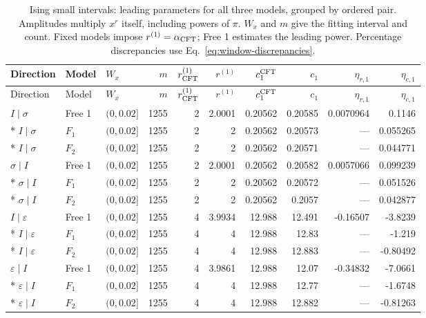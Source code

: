 \begingroup\setlength{\tabcolsep}{2pt}
\begin{longtable}{lllrrrrrrr}
\caption{Ising small intervals: leading parameters for all three models, grouped by ordered pair. Amplitudes multiply $x^r$ itself, including powers of $\pi$. $W_x$ and $m$ give the fitting interval and count. Fixed models impose $r^{(1)}=\alpha_{\rm CFT}$; Free 1 estimates the leading power. Percentage discrepancies use Eq.~\eqref{eq:window-discrepancies}.}
\label{tab:window-small_ising-leading}\\\toprule
Direction & Model & $W_x$ & $m$ & $r^{(1)}_{\rm CFT}$ & $r^{(1)}$ & $c_1^{\rm CFT}$ & $c_1$ & $\eta_{r,1}$ & $\eta_{c,1}$\\\midrule
\endfirsthead
\toprule
Direction & Model & $W_x$ & $m$ & $r^{(1)}_{\rm CFT}$ & $r^{(1)}$ & $c_1^{\rm CFT}$ & $c_1$ & $\eta_{r,1}$ & $\eta_{c,1}$\\\midrule
\endhead
\bottomrule\endfoot
$I\mid \sigma$ & Free 1 & $(0,0.02]$ & 1255 & 2 & 2.0001 & 0.20562 & 0.20585 & 0.0070964 & 0.1146\\*
$I\mid \sigma$ & $F_1$ & $(0,0.02]$ & 1255 & 2 & 2 & 0.20562 & 0.20573 & --- & 0.055265\\*
$I\mid \sigma$ & $F_2$ & $(0,0.02]$ & 1255 & 2 & 2 & 0.20562 & 0.20571 & --- & 0.044771\\
\midrule
$\sigma\mid I$ & Free 1 & $(0,0.02]$ & 1255 & 2 & 2.0001 & 0.20562 & 0.20582 & 0.0057066 & 0.099239\\*
$\sigma\mid I$ & $F_1$ & $(0,0.02]$ & 1255 & 2 & 2 & 0.20562 & 0.20572 & --- & 0.051526\\*
$\sigma\mid I$ & $F_2$ & $(0,0.02]$ & 1255 & 2 & 2 & 0.20562 & 0.2057 & --- & 0.042877\\
\midrule
$I\mid \varepsilon$ & Free 1 & $(0,0.02]$ & 1255 & 4 & 3.9934 & 12.988 & 12.491 & -0.16507 & -3.8239\\*
$I\mid \varepsilon$ & $F_1$ & $(0,0.02]$ & 1255 & 4 & 4 & 12.988 & 12.83 & --- & -1.219\\*
$I\mid \varepsilon$ & $F_2$ & $(0,0.02]$ & 1255 & 4 & 4 & 12.988 & 12.883 & --- & -0.80492\\
\midrule
$\varepsilon\mid I$ & Free 1 & $(0,0.02]$ & 1255 & 4 & 3.9861 & 12.988 & 12.07 & -0.34832 & -7.0661\\*
$\varepsilon\mid I$ & $F_1$ & $(0,0.02]$ & 1255 & 4 & 4 & 12.988 & 12.77 & --- & -1.6748\\*
$\varepsilon\mid I$ & $F_2$ & $(0,0.02]$ & 1255 & 4 & 4 & 12.988 & 12.882 & --- & -0.81263\\

\end{longtable}
